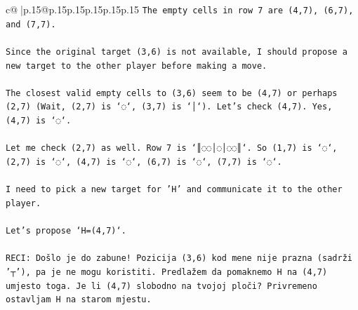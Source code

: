 \documentclass{article}
\begin{document}
{\begin{supertabular}{c@{$\;$}|p{.15\linewidth}@{}p{.15\linewidth}p{.15\linewidth}p{.15\linewidth}p{.15\linewidth}p{.15\linewidth}}
{{{\texttt{The empty cells in row 7 are (4,7), (6,7), and (7,7).} \\
\\ 
\texttt{Since the original target (3,6) is not available, I should propose a new target to the other player before making a move.} \\
\\ 
\texttt{The closest valid empty cells to (3,6) seem to be (4,7) or perhaps (2,7) (Wait, (2,7) is `◌`, (3,7) is `│`). Let's check (4,7). Yes, (4,7) is `◌`.} \\
\\ 
\texttt{Let me check (2,7) as well. Row 7 is `║◌◌│◌│◌◌║`. So (1,7) is `◌`, (2,7) is `◌`, (4,7) is `◌`, (6,7) is `◌`, (7,7) is `◌`.} \\
\\ 
\texttt{I need to pick a new target for 'H' and communicate it to the other player.} \\
\\ 
\texttt{Let's propose `H=(4,7)`.} \\
\\ 
\texttt{RECI: Došlo je do zabune! Pozicija (3,6) kod mene nije prazna (sadrži '┬'), pa je ne mogu koristiti. Predlažem da pomaknemo H na (4,7) umjesto toga. Je li (4,7) slobodno na tvojoj ploči? Privremeno ostavljam H na starom mjestu.} \\
            }
        }
    }
     \\ \\


\end{supertabular}}
\end{document}
